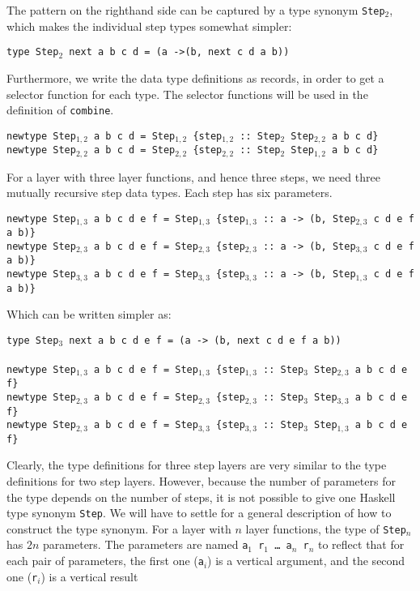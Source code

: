The pattern on the righthand side can be captured by a type synonym \texttt{Step$_2$}, which makes the individual step types somewhat simpler:

{\tt type Step$_2$ next a b c d = (a ->(b, next c d a b))}

Furthermore, we write the data type definitions as records, in order to get a selector function for each type. The selector functions will be used in the definition of \texttt{combine}.

{\tt newtype Step$_{1,2}$ a b c d = Step$_{1,2}$ \{step$_{1,2}$}\verb| :: |{\tt Step$_2$ Step$_{2,2}$  a b c d\}}\\
{\tt newtype Step$_{2,2}$ a b c d = Step$_{2,2}$ \{step$_{2,2}$}\verb| :: |{\tt Step$_2$ Step$_{1,2}$  a b c d\}}


For a layer with three layer functions, and hence three steps, we need three mutually recursive step data types. Each step has six parameters.

{\tt newtype Step$_{1,3}$ a b c d e f = Step$_{1,3}$ \{step$_{1,3}$}\verb| :: |{\tt a -> (b, Step$_{2,3}$ c d e f a b)\}}\\
{\tt newtype Step$_{2,3}$ a b c d e f = Step$_{2,3}$ \{step$_{2,3}$}\verb| :: |{\tt a -> (b, Step$_{3,3}$ c d e f a b)\}}\\
{\tt newtype Step$_{3,3}$ a b c d e f = Step$_{3,3}$ \{step$_{3,3}$}\verb| :: |{\tt a -> (b, Step$_{1,3}$ c d e f a b)\}}

Which can be written simpler as:

{\tt type Step$_3$ next a b c d e f = (a -> (b, next c d e f a b))}\\
\\
{\tt newtype Step$_{1,3}$ a b c d e f = Step$_{1,3}$ \{step$_{1,3}$}\verb| :: |{\tt Step$_3$ Step$_{2,3}$ a b c d e f\} }\\
{\tt newtype Step$_{2,3}$ a b c d e f = Step$_{2,3}$ \{step$_{2,3}$}\verb| :: |{\tt Step$_3$ Step$_{3,3}$ a b c d e f\} }\\
{\tt newtype Step$_{2,3}$ a b c d e f = Step$_{3,3}$ \{step$_{3,3}$}\verb| :: |{\tt Step$_3$ Step$_{1,3}$ a b c d e f\} }

Clearly, the type definitions for three step layers are very similar to the type definitions for two step layers. However, because the number of parameters for the type depends on the number of steps, it is not possible to give one Haskell type synonym \texttt{Step}. We will have to settle for a general description of how to construct the type synonym. For a layer with $n$ layer functions, the type of \texttt{Step$_n$} has $2n$ parameters. The parameters are named \texttt{a$_1$ r$_1$ \dots ~a$_n$ r$_n$} to reflect that for each pair of parameters, the first one (\texttt{a$_i$}) is a vertical argument, and the second one (\texttt{r$_i$}) is a vertical result 

